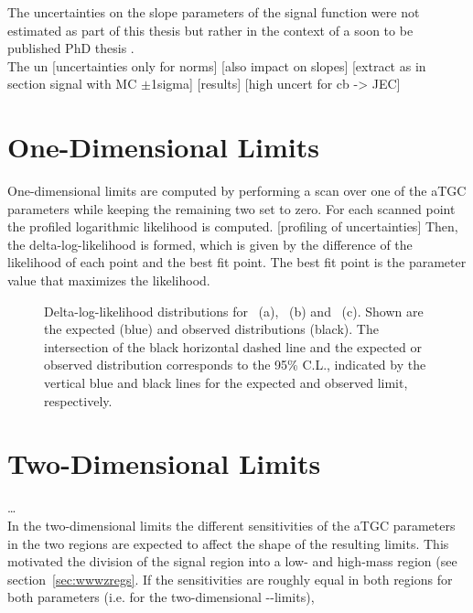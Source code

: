 The uncertainties on the slope parameters of the signal function were not estimated as part of this thesis but rather in the context of a soon to be published PhD thesis \cite{IVAN}.\\

\noindent The un
[uncertainties only for norms]
[also impact on slopes]
[extract as in section signal with MC $\pm$1sigma]
[results]
[high uncert for cb -> JEC]


\section{One-Dimensional Limits}
One-dimensional limits are computed by performing a scan over one of the aTGC parameters while keeping the remaining two set to zero. For each scanned point the profiled logarithmic likelihood is computed.
[profiling of uncertainties]
Then, the delta-log-likelihood is formed, which is given by the difference of the likelihood of each point and the best fit point. The best fit point is the parameter value that maximizes the likelihood. 

\begin{figure}
	\centering
	\caption[Delta-log-likelihood distributions for the three aTGC parameters]{Delta-log-likelihood distributions for \Tcwww \ (a), \Tccw \ (b) and \Tcb \ (c). Shown are the expected (blue) and observed distributions (black). The intersection of the black horizontal dashed line and the expected or observed distribution corresponds to the 95\% C.L., indicated by the vertical blue and black lines for the expected and observed limit, respectively.}
	\label{fig:limits:1dlimits}
\end{figure}

\section{Two-Dimensional Limits}
\label{sec:2dlims}
\dots \\
\noindent In the two-dimensional limits the different sensitivities of the aTGC parameters in the two regions are expected to affect the shape of the resulting limits. This motivated the division of the signal region into a low- and high-mass region (see section~\ref{sec:wwwzregs}. If the sensitivities are roughly equal in both regions for both parameters (i.e. for the two-dimensional \Tcwww -\Tccw -limits), 

